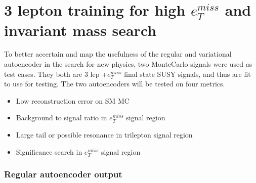 
\section{3 lepton training for high $e_T^{miss}$ and invariant mass search}\label{sec:3lep}


To better accertain and map the usefulness of the regular and variational autoencoder in the search for 
new physics, two MonteCarlo signals were used as test cases. They both are 3 lep +$e_T^{miss}$ final state SUSY signals,
and thus are fit to use for testing. The two autoencoders will be tested on four metrics. 
\begin{itemize}
    \item Low reconstruction error on SM MC
    \item Background to signal ratio in $e_T^{miss}$ signal region
    \item Large tail or possible resonance in trilepton signal region
    \item Significance search in $e_T^{miss}$ signal region
\end{itemize}



\subsubsection*{Regular autoencoder output}


